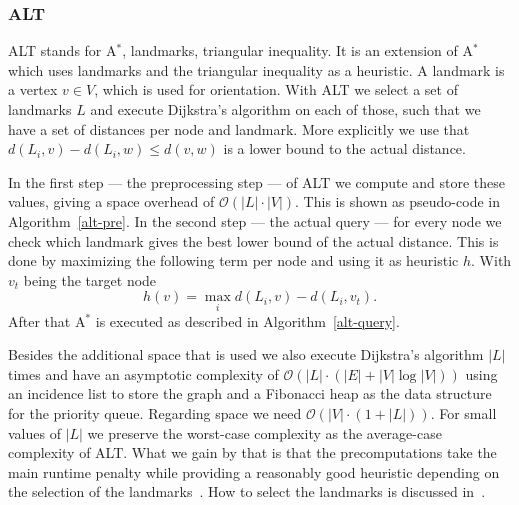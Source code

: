         \subsubsection*{ALT}
            ALT stands for A$^*$, landmarks, triangular inequality. 
            It is an extension of A$^*$ which uses landmarks and the triangular inequality as a heuristic. 
            A landmark is a vertex $v \in V$, which is used for orientation. 
            With ALT we select a set of landmarks $L$ and execute Dijkstra's algorithm on each of those, such that we have a set of distances per node and landmark.
            More explicitly we use that $d(L_i, v) - d(L_i, w) \leq d(v,w)$ is a lower bound to the actual distance.
            
            In the first step --- the preprocessing step --- of ALT we compute and store these values, giving a space overhead of $\mathcal{O}(|L| \cdot |V|)$. 
            This is shown as pseudo-code in Algorithm~\ref{alt-pre}.
            In the second step --- the actual query --- for every node we check which landmark gives the best lower bound of the actual distance.
            This is done by maximizing the following term per node and using it as heuristic $h$.
            With $v_t$ being the target node
            \[ h(v) = \max_i d(L_i, v) - d(L_i, v_t). \]
            After that A$^*$ is executed as described in Algorithm~\ref{alt-query}.
            
            Besides the additional space that is used we also execute Dijkstra's algorithm $|L|$ times and have an asymptotic complexity of $\mathcal{O}(|L| \cdot (|E| + |V| \log |V|))$ using an incidence list to store the graph and a Fibonacci heap as the data structure for the priority queue. 
            Regarding space we need $\mathcal{O}(|V| \cdot (1 + |L|))$. 
            For small values of $|L|$ we preserve the worst-case complexity as the average-case complexity of ALT.
            What we gain by that is that the precomputations take the main runtime penalty while providing a reasonably good heuristic depending on the selection of the landmarks~\autocite{goldberg2005computing}. 
            How to select the landmarks is discussed in~\autocite{Goldberg2005ComputingPS}.
            

